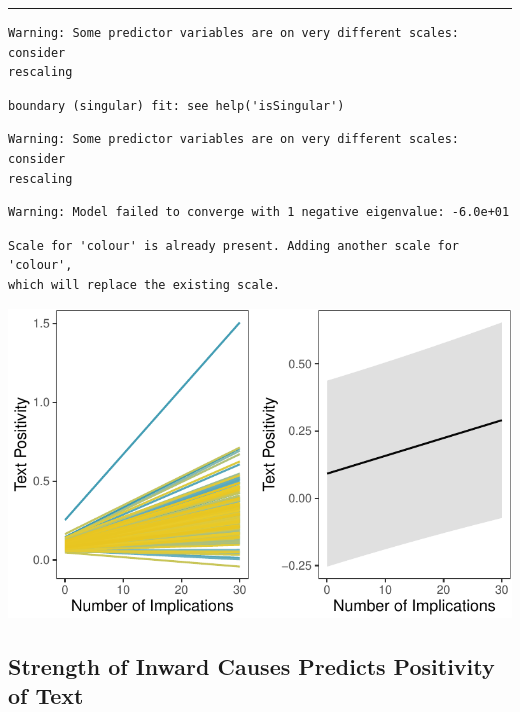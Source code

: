 \documentclass[
  .7em,
  letterpaper,
  DIV=11,
  numbers=noendperiod]{scrartcl}
\begin{document}
\begin{center}\rule{0.5\linewidth}{0.5pt}\end{center}

\begin{verbatim}
Warning: Some predictor variables are on very different scales: consider
rescaling
\end{verbatim}

\begin{verbatim}
boundary (singular) fit: see help('isSingular')
\end{verbatim}

\begin{verbatim}
Warning: Some predictor variables are on very different scales: consider
rescaling
\end{verbatim}

\begin{verbatim}
Warning: Model failed to converge with 1 negative eigenvalue: -6.0e+01
\end{verbatim}

\begin{verbatim}
Scale for 'colour' is already present. Adding another scale for 'colour',
which will replace the existing scale.
\end{verbatim}

\includegraphics{EpMemNet_LabPres_htmldoc_files/figure-pdf/unnamed-chunk-13-1.pdf}

\hypertarget{strength-of-inward-causes-predicts-positivity-of-text}{%
\subsection{Strength of Inward Causes Predicts Positivity of
Text}\label{strength-of-inward-causes-predicts-positivity-of-text}}
\end{document}
